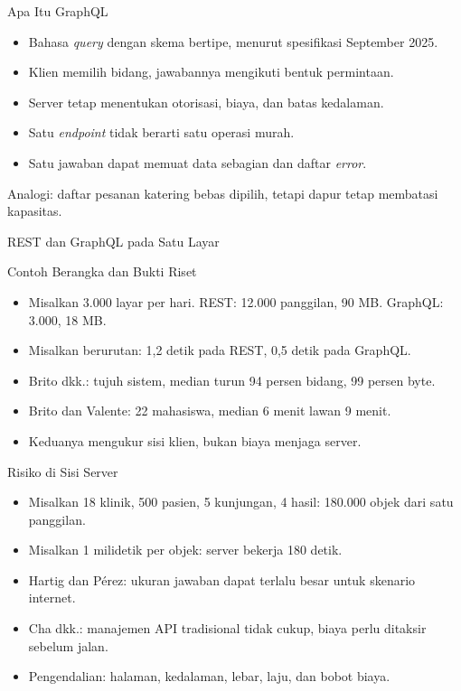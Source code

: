 \documentclass[aspectratio=169, table, 12pt]{beamer}
\begin{document}
\begin{frame}{{\Large Apa Itu GraphQL}}
  \vspace{10pt}
  \begin{itemize}
    \item Bahasa \textit{query} dengan skema bertipe, menurut spesifikasi September 2025.
    \item Klien memilih bidang, jawabannya mengikuti bentuk permintaan.
    \item Server tetap menentukan otorisasi, biaya, dan batas kedalaman.
    \item Satu \textit{endpoint} tidak berarti satu operasi murah.
    \item Satu jawaban dapat memuat data sebagian dan daftar \textit{error}.
  \end{itemize}
  \vspace{6pt}
  {\small Analogi: daftar pesanan katering bebas dipilih, tetapi dapur tetap membatasi kapasitas.}
\end{frame}

\begin{frame}{{\Large REST dan GraphQL pada Satu Layar}}
  \centering
\end{frame}

\begin{frame}{{\Large Contoh Berangka dan Bukti Riset}}
  \vspace{10pt}
  \begin{itemize}
    \item Misalkan 3.000 layar per hari. REST: 12.000 panggilan, 90 MB. GraphQL: 3.000, 18 MB.
    \item Misalkan berurutan: 1,2 detik pada REST, 0,5 detik pada GraphQL.
    \item Brito dkk.: tujuh sistem, median turun 94 persen bidang, 99 persen byte.
    \item Brito dan Valente: 22 mahasiswa, median 6 menit lawan 9 menit.
    \item Keduanya mengukur sisi klien, bukan biaya menjaga server.
  \end{itemize}
\end{frame}

\begin{frame}{{\Large Risiko di Sisi Server}}
  \vspace{10pt}
  \begin{itemize}
    \item Misalkan 18 klinik, 500 pasien, 5 kunjungan, 4 hasil: 180.000 objek dari satu panggilan.
    \item Misalkan 1 milidetik per objek: server bekerja 180 detik.
    \item Hartig dan P{\'e}rez: ukuran jawaban dapat terlalu besar untuk skenario internet.
    \item Cha dkk.: manajemen API tradisional tidak cukup, biaya perlu ditaksir sebelum jalan.
    \item Pengendalian: halaman, kedalaman, lebar, laju, dan bobot biaya.
  \end{itemize}
\end{frame}
\end{document}
